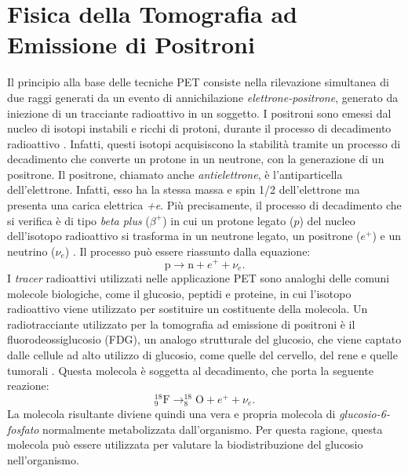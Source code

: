 \chapter{Fisica della Tomografia ad Emissione di Positroni}
Il principio alla base delle tecniche PET consiste nella rilevazione simultanea di due raggi \textGamma generati da un evento di annichilazione \textit{elettrone-positrone}, generato da iniezione di un tracciante radioattivo in un soggetto. I positroni sono emessi dal nucleo di isotopi instabili e ricchi di protoni, durante il processo di decadimento radioattivo \cite{Bailey2014}. Infatti, questi isotopi acquisiscono la stabilità tramite un processo di decadimento che converte un protone in un neutrone, con la generazione di un positrone. Il positrone, chiamato anche \textit{antielettrone}, è l'antiparticella dell'elettrone. Infatti, esso ha la stessa massa e spin 1/2 dell'elettrone ma presenta una carica elettrica \textit{+e}. Più precisamente, il processo di decadimento che si verifica è di tipo \textit{beta plus} ($\beta^+$) in cui un protone legato ($p$) del nucleo dell'isotopo radioattivo si trasforma in un neutrone legato, un positrone ($e^+$) e un neutrino ($\nu_e$) \cite{Betaplus}. Il processo può essere riassunto dalla equazione:
\begin{equation}
	\text{p}\to \text{n} + e^+ + \nu_e.
\end{equation}
I \textit{tracer} radioattivi utilizzati nelle applicazione PET sono analoghi delle comuni molecole biologiche, come il glucosio, peptidi e proteine, in cui l'isotopo radioattivo viene utilizzato per sostituire un costituente della molecola. Un radiotracciante utilizzato per la tomografia ad emissione di positroni è il fluorodeossiglucosio (FDG), un analogo strutturale del glucosio, che viene captato dalle cellule ad alto utilizzo di glucosio, come quelle del cervello, del rene e quelle tumorali \cite{FDG}. Questa molecola è soggetta al decadimento, che porta la seguente reazione:
\begin{equation}
	^{18}_9\text{F}\to ^{18}_8\text{O} + e^+ + \nu_e.
\end{equation}
La molecola risultante diviene quindi una vera e propria molecola di \textit{glucosio-6-fosfato} normalmente metabolizzata dall'organismo. Per questa ragione, questa molecola può essere utilizzata per valutare la biodistribuzione del glucosio nell'organismo.

